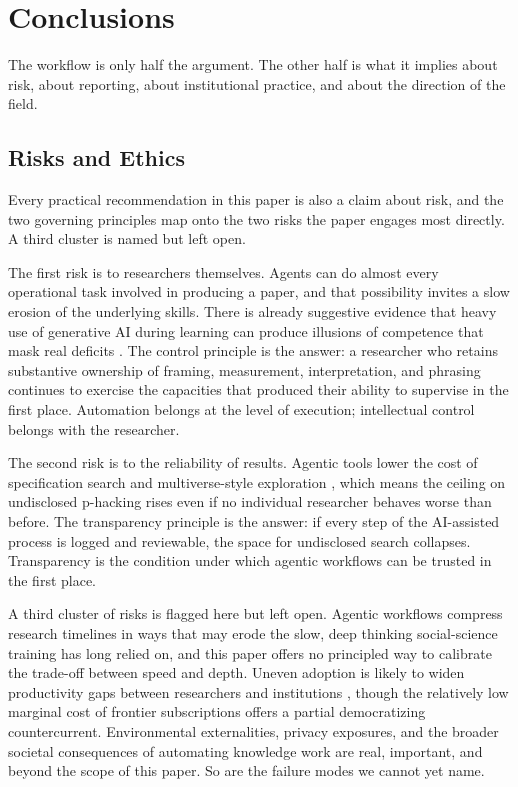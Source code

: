 \documentclass[11pt]{article}
\begin{document}
\section{Conclusions}
\label{sec:conclusions}

The workflow is only half the argument. The other half is what it implies about risk, about reporting, about institutional practice, and about the direction of the field.

\subsection{Risks and Ethics}
\label{sec:risks}

Every practical recommendation in this paper is also a claim about risk, and the two governing principles map onto the two risks the paper engages most directly. A third cluster is named but left open.

The first risk is to researchers themselves. Agents can do almost every operational task involved in producing a paper, and that possibility invites a slow erosion of the underlying skills. There is already suggestive evidence that heavy use of generative AI during learning can produce illusions of competence that mask real deficits \citep{prather2024widening}. The control principle is the answer: a researcher who retains substantive ownership of framing, measurement, interpretation, and phrasing continues to exercise the capacities that produced their ability to supervise in the first place. Automation belongs at the level of execution; intellectual control belongs with the researcher.

The second risk is to the reliability of results. Agentic tools lower the cost of specification search and multiverse-style exploration \citep{steegen2016multiverse, simmons2011falsepositive}, which means the ceiling on undisclosed p-hacking rises even if no individual researcher behaves worse than before. The transparency principle is the answer: if every step of the AI-assisted process is logged and reviewable, the space for undisclosed search collapses. Transparency is the condition under which agentic workflows can be trusted in the first place.

A third cluster of risks is flagged here but left open. Agentic workflows compress research timelines in ways that may erode the slow, deep thinking social-science training has long relied on, and this paper offers no principled way to calibrate the trade-off between speed and depth. Uneven adoption is likely to widen productivity gaps between researchers and institutions \citep{mohammadi2026reshaping, chugunova2026germany}, though the relatively low marginal cost of frontier subscriptions offers a partial democratizing countercurrent. Environmental externalities, privacy exposures, and the broader societal consequences of automating knowledge work are real, important, and beyond the scope of this paper. So are the failure modes we cannot yet name.
\end{document}
